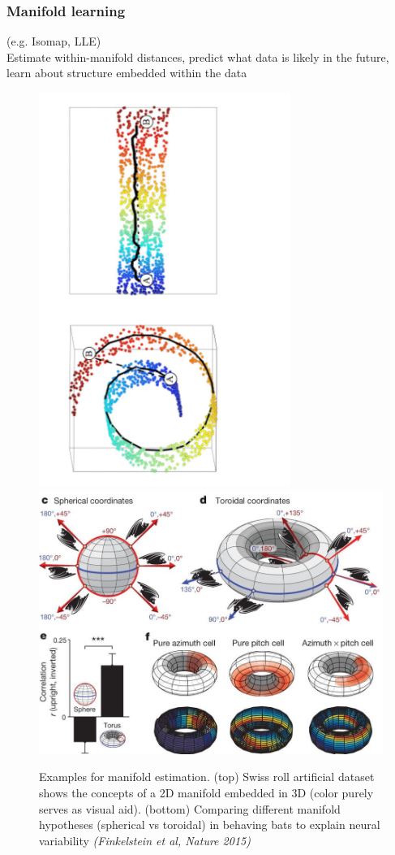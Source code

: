 \documentclass[11pt]{article}
\begin{document}
 \clearpage
 
\subsubsection{Manifold learning} 
(e.g. Isomap, LLE) \\ Estimate within-manifold distances, predict what data is likely in the future, learn about structure embedded within the data
 

\begin{figure}[h!]
\centering
\includegraphics[width=0.73\textwidth]{swiss-unroll-distance}
\\ 
\includegraphics[width=0.5\linewidth]{bat_neurons_nature14031-f3} 
\caption{Examples for manifold estimation. (top) Swiss roll artificial dataset shows the concepts of a 2D manifold embedded in 3D (color purely serves as visual aid). (bottom) Comparing different manifold hypotheses (spherical vs toroidal) in behaving bats to explain neural variability \emph{(Finkelstein et al, Nature 2015)}}
\end{figure} 
\end{document}
